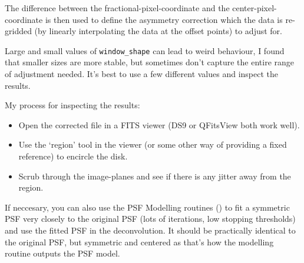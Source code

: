 The difference between the fractional-pixel-coordinate and the center-pixel-coordinate is then used to define the asymmetry correction which the data is re-gridded (by linearly interpolating the data at the offset points) to adjust for.

Large and small values of \verb|window_shape| can lead to weird behaviour, I found that smaller sizes are more stable, but sometimes don't capture the entire range of adjustment needed. It's best to use a few different values and inspect the results.

My process for inspecting the results:
\begin{itemize}
	\item Open the corrected file in a FITS viewer (DS9 or QFitsView both work well).
	\item Use the `region' tool in the viewer (or some other way of providing a fixed reference) to encircle the disk.
	\item Scrub through the image-planes and see if there is any jitter away from the region.
\end{itemize}

If neccesary, you can also use the PSF Modelling routines () to fit a symmetric PSF very closely to the original PSF (lots of iterations, low stopping thresholds) and use the fitted PSF in the deconvolution. It should be practically identical to the original PSF, but symmetric and centered as that's how the modelling routine outputs the PSF model.










































